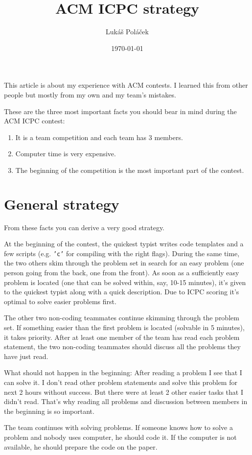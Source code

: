 \documentclass{article}
\author{Lukáš Poláček}
\title{ACM ICPC strategy}
\date{\today}
\begin{document}
\maketitle
\fi
This article is about my experience with ACM contests. I learned this from other
people but mostly from my own and my team's mistakes.

These are the three most important facts you should bear in mind during the ACM ICPC
contest:
\begin{enumerate}
\item It is a team competition and each team has 3 members.
\item Computer time is very expensive.
\item The beginning of the competition is the most important part of the contest.
\end{enumerate}

\section{General strategy}
From these facts you can derive a very good strategy.

At the beginning of the contest, the quickest typist writes code templates and a
few scripts (e.g. {\tt 'c'} for compiling with the right flags). During the same
time, the two others skim through the problem set in search for an easy problem
(one person going from the back, one from the front). As soon as a sufficiently
easy problem is located (one that can be solved within, say, 10-15 minutes),
it's given to the quickest typist along with a quick description. Due to ICPC
scoring it's optimal to solve easier problems first.

The other two non-coding teammates continue skimming through the problem set.
If something easier than the first problem is located (solvable in 5 minutes),
it takes priority. After at least one member of the team has read each problem
statement, the two non-coding teammates should discuss all the problems they
have just read.

What should not happen in the beginning: After reading a problem I see that I
can solve it. I don't read other problem statements and solve this problem for
next 2 hours without success. But there were at least 2 other easier tasks that
I didn't read. That's why reading all problems and discussion between members in
the beginning is so important.

The team continues with solving problems. If someone knows how to solve a
problem and nobody uses computer, he should code it. If the computer is not
available, he should prepare the code on the paper.
\end{document}
